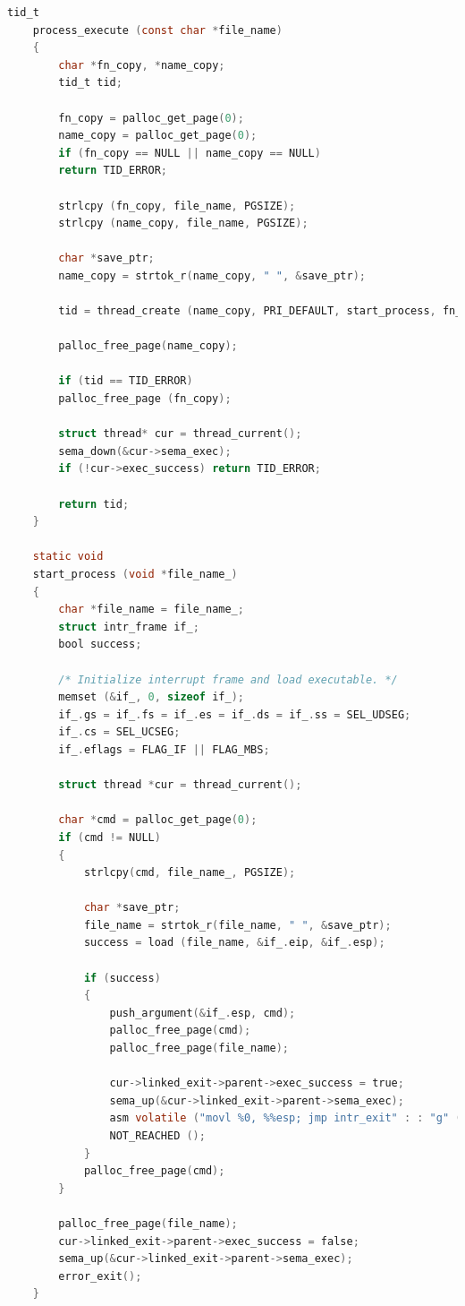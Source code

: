 \documentclass{article}
\begin{document}
\begin{lstlisting}[language=C]
	tid_t
	process_execute (const char *file_name)
	{
		char *fn_copy, *name_copy;
		tid_t tid;
		
		fn_copy = palloc_get_page(0);
		name_copy = palloc_get_page(0);
		if (fn_copy == NULL || name_copy == NULL)
		return TID_ERROR;
		
		strlcpy (fn_copy, file_name, PGSIZE);
		strlcpy (name_copy, file_name, PGSIZE);
		
		char *save_ptr;
		name_copy = strtok_r(name_copy, " ", &save_ptr);
		
		tid = thread_create (name_copy, PRI_DEFAULT, start_process, fn_copy);
		
		palloc_free_page(name_copy);
		
		if (tid == TID_ERROR)
		palloc_free_page (fn_copy);
		
		struct thread* cur = thread_current();
		sema_down(&cur->sema_exec);
		if (!cur->exec_success) return TID_ERROR;
		
		return tid;
	}
	
	static void
	start_process (void *file_name_)
	{
		char *file_name = file_name_; 
		struct intr_frame if_; 
		bool success;
		
		/* Initialize interrupt frame and load executable. */
		memset (&if_, 0, sizeof if_);
		if_.gs = if_.fs = if_.es = if_.ds = if_.ss = SEL_UDSEG;
		if_.cs = SEL_UCSEG;
		if_.eflags = FLAG_IF || FLAG_MBS;
		
		struct thread *cur = thread_current();
		
		char *cmd = palloc_get_page(0);
		if (cmd != NULL)
		{
			strlcpy(cmd, file_name_, PGSIZE);
			
			char *save_ptr;
			file_name = strtok_r(file_name, " ", &save_ptr);
			success = load (file_name, &if_.eip, &if_.esp);
			
			if (success)
			{
				push_argument(&if_.esp, cmd);
				palloc_free_page(cmd);
				palloc_free_page(file_name);
				
				cur->linked_exit->parent->exec_success = true;
				sema_up(&cur->linked_exit->parent->sema_exec);
				asm volatile ("movl %0, %%esp; jmp intr_exit" : : "g" (&if_) : "memory");
				NOT_REACHED ();
			}
			palloc_free_page(cmd);
		}
		
		palloc_free_page(file_name);
		cur->linked_exit->parent->exec_success = false;
		sema_up(&cur->linked_exit->parent->sema_exec);
		error_exit();
	}
\end{lstlisting}
\end{document}
